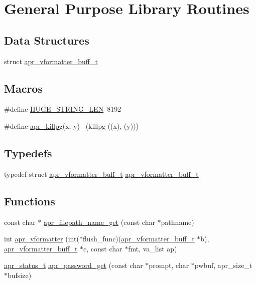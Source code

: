 \hypertarget{group__apr__lib}{}\section{General Purpose Library Routines}
\label{group__apr__lib}
\subsection*{Data Structures}
\begin{DoxyCompactItemize}
\item 
struct \hyperlink{structapr__vformatter__buff__t}{apr\+\_\+vformatter\+\_\+buff\+\_\+t}
\end{DoxyCompactItemize}
\subsection*{Macros}
\begin{DoxyCompactItemize}
\item 
\#define \hyperlink{group__apr__lib_ga0c9dd98f46b90b5bcd4cbf75e252d0da}{H\+U\+G\+E\+\_\+\+S\+T\+R\+I\+N\+G\+\_\+\+L\+EN}~8192
\item 
\#define \hyperlink{group__apr__lib_gaf138e3f0273185532f1aa4443b40d428}{apr\+\_\+killpg}(x,  y)            ~(killpg ((x), (y)))
\end{DoxyCompactItemize}
\subsection*{Typedefs}
\begin{DoxyCompactItemize}
\item 
typedef struct \hyperlink{structapr__vformatter__buff__t}{apr\+\_\+vformatter\+\_\+buff\+\_\+t} \hyperlink{group__apr__lib_ga5e9986deebda40f2d1cf8364fa03c3c5}{apr\+\_\+vformatter\+\_\+buff\+\_\+t}
\end{DoxyCompactItemize}
\subsection*{Functions}
\begin{DoxyCompactItemize}
\item 
const char $\ast$ \hyperlink{group__apr__lib_ga241e929df23aede34eb3f2651cf56bc9}{apr\+\_\+filepath\+\_\+name\+\_\+get} (const char $\ast$pathname)
\item 
int \hyperlink{group__apr__lib_gad2cd3594aeaafd45931d1034965f48c1}{apr\+\_\+vformatter} (int($\ast$flush\+\_\+func)(\hyperlink{structapr__vformatter__buff__t}{apr\+\_\+vformatter\+\_\+buff\+\_\+t} $\ast$b), \hyperlink{structapr__vformatter__buff__t}{apr\+\_\+vformatter\+\_\+buff\+\_\+t} $\ast$c, const char $\ast$fmt, va\+\_\+list ap)
\item 
\hyperlink{group__apr__errno_gaf76ee4543247e9fb3f3546203e590a6c}{apr\+\_\+status\+\_\+t} \hyperlink{group__apr__lib_ga377e0677598745769ec6f80fecf8f859}{apr\+\_\+password\+\_\+get} (const char $\ast$prompt, char $\ast$pwbuf, apr\+\_\+size\+\_\+t $\ast$bufsize)
\end{DoxyCompactItemize}


